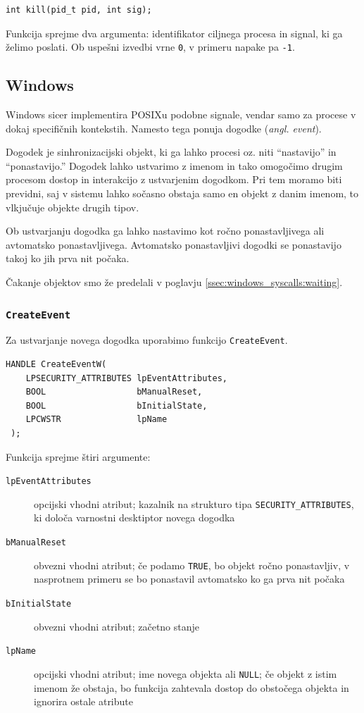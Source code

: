 \documentclass[a4paper,12pt,openright]{book}
\begin{document}
\begin{lstlisting}[style=func]
 int kill(pid_t pid, int sig);
\end{lstlisting}

Funkcija sprejme dva argumenta: identifikator ciljnega procesa in signal, ki ga želimo poslati.
Ob uspešni izvedbi vrne \texttt{0}, v primeru napake pa \texttt{-1}.

\subsection{Windows}

Windows sicer implementira POSIXu podobne signale, vendar samo za procese v dokaj specifičnih kontekstih.
Namesto tega ponuja dogodke (\textit{angl. event}).

Dogodek je sinhronizacijski objekt, ki ga lahko procesi oz. niti ``nastavijo'' in ``ponastavijo.''
Dogodek lahko ustvarimo z imenom in tako omogočimo drugim procesom dostop in interakcijo z ustvarjenim dogodkom.
Pri tem moramo biti previdni, saj v sistemu lahko sočasno obstaja samo en objekt z danim imenom, to vlkjučuje objekte drugih tipov.

Ob ustvarjanju dogodka ga lahko nastavimo kot ročno ponastavljivega ali avtomatsko ponastavljivega.
Avtomatsko ponastavljivi dogodki se ponastavijo takoj ko jih prva nit počaka.

Čakanje objektov smo že predelali v poglavju \ref{ssec:windows_syscalls:waiting}.

\subsubsection{\texttt{CreateEvent}}

Za ustvarjanje novega dogodka uporabimo funkcijo \texttt{CreateEvent}.

\begin{lstlisting}[style=func]
 HANDLE CreateEventW(
	LPSECURITY_ATTRIBUTES lpEventAttributes,
	BOOL                  bManualReset,
	BOOL                  bInitialState,
	LPCWSTR               lpName
 );
\end{lstlisting}

Funkcija sprejme štiri argumente:
\begin{description}
	\item[\texttt{lpEventAttributes}] opcijski vhodni atribut; kazalnik na strukturo tipa \texttt{SECURITY\_ATTRIBUTES}, ki določa varnostni desktiptor novega dogodka
	\item[\texttt{bManualReset}] obvezni vhodni atribut; če podamo \texttt{TRUE}, bo objekt ročno ponastavljiv, v nasprotnem primeru se bo ponastavil avtomatsko ko ga prva nit počaka
	\item[\texttt{bInitialState}] obvezni vhodni atribut; začetno stanje
	\item[\texttt{lpName}] opcijski vhodni atribut; ime novega objekta ali \texttt{NULL}; če objekt z istim imenom že obstaja, bo funkcija zahtevala dostop do obstočega objekta in ignorira ostale atribute
\end{description}
\end{document}
